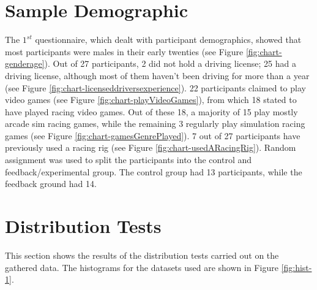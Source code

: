 \section{Sample Demographic}
\label{sec:eval-demographic}
The $1^{st}$ questionnaire, which dealt with participant demographics, showed that most participants were males in their early twenties (see Figure \ref{fig:chart-genderage}). Out of 27 participants, 2 did not hold a driving license; 25 had a driving license, although most of them haven't been driving for more than a year (see Figure \ref{fig:chart-licenseddriversexperience}). 22 participants claimed to play video games (see Figure \ref{fig:chart-playVideoGames}), from which 18 stated to have played racing video games. Out of these 18, a majority of 15 play mostly arcade sim racing games, while the remaining 3 regularly play simulation racing games (see Figure \ref{fig:chart-gamesGenrePlayed}). 7 out of 27 participants have previously used a racing rig (see Figure \ref{fig:chart-usedARacingRig}). Random assignment was used to split the participants into the control and feedback/experimental group. The control group had 13 participants, while the feedback ground had 14.


\section{Distribution Tests}
\label{sec:eval-distTests}
This section shows the results of the distribution tests carried out on the gathered data. The histograms for the datasets used are shown in Figure \ref{fig:hist-1}.

